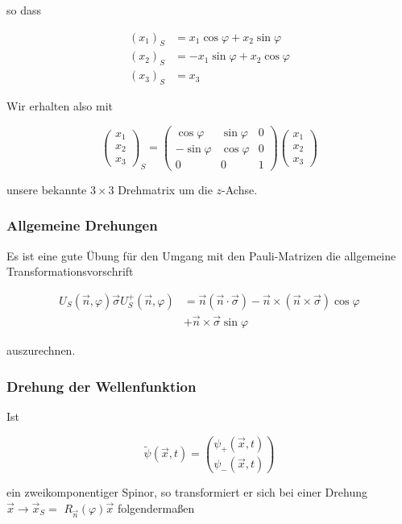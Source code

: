 \documentclass[10pt, letterpaper]{article}
\begin{document}
so dass

$$
\begin{aligned}
\left(x_{1}\right)_{S} & =x_{1} \cos \varphi+x_{2} \sin \varphi \\
\left(x_{2}\right)_{S} & =-x_{1} \sin \varphi+x_{2} \cos \varphi \\
\left(x_{3}\right)_{S} & =x_{3}
\end{aligned}
$$

Wir erhalten also mit

$$
\left(\begin{array}{l}
x_{1} \\
x_{2} \\
x_{3}
\end{array}\right)_{S}=\left(\begin{array}{ccc}
\cos \varphi & \sin \varphi & 0 \\
-\sin \varphi & \cos \varphi & 0 \\
0 & 0 & 1
\end{array}\right)\left(\begin{array}{l}
x_{1} \\
x_{2} \\
x_{3}
\end{array}\right)
$$

unsere bekannte $3 \times 3$ Drehmatrix um die $z$-Achse.

\subsubsection*{Allgemeine Drehungen}
Es ist eine gute Übung für den Umgang mit den Pauli-Matrizen die allgemeine Transformationsvorschrift

$$
\begin{aligned}
U_{S}(\vec{n}, \varphi) \vec{\sigma} U_{S}^{+}(\vec{n}, \varphi) & =\vec{n}(\vec{n} \cdot \vec{\sigma})-\vec{n} \times(\vec{n} \times \vec{\sigma}) \cos \varphi \\
& +\vec{n} \times \vec{\sigma} \sin \varphi
\end{aligned}
$$

auszurechnen.

\subsubsection*{Drehung der Wellenfunktion}
Ist

$$
\widetilde{\psi}(\vec{x}, t)=\binom{\psi_{+}(\vec{x}, t)}{\psi_{-}(\vec{x}, t)}
$$

ein zweikomponentiger Spinor, so transformiert er sich bei einer Drehung $\vec{x} \rightarrow \vec{x}_{S}=$ $R_{\vec{n}}(\varphi) \vec{x}$ folgendermaßen
\end{document}
